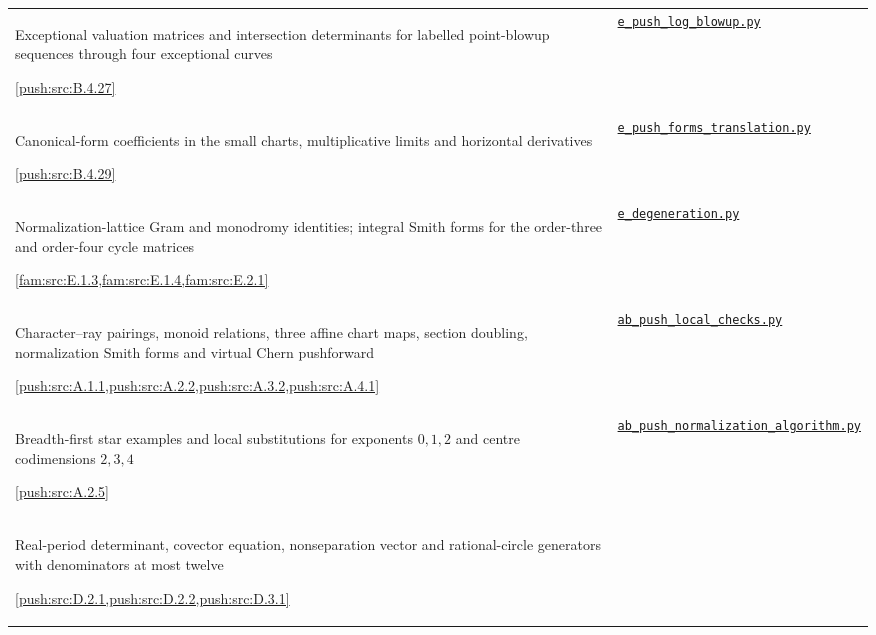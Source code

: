 {\begin{longtable}{@{}>{\raggedright\arraybackslash}p{}>{\raggedright\arraybackslash}p{}@{}}
Exceptional valuation matrices and intersection determinants for labelled point-blowup sequences through four exceptional curves\par \cref{push:src:B.4.27} &
\href{https://raw.githubusercontent.com/KokunoYumeto/s6-complex-structure-workbench/\SsixRepositoryCommit/pro_returns/S6_02_PUSH_final_20261115T2217Z/S6_02_PUSH/code/e_push_log_blowup.py}{\nolinkurl{e_push_log_blowup.py}} \\[3pt]
Canonical-form coefficients in the small charts, multiplicative limits and horizontal derivatives\par \cref{push:src:B.4.29} &
\href{https://raw.githubusercontent.com/KokunoYumeto/s6-complex-structure-workbench/\SsixRepositoryCommit/pro_returns/S6_02_PUSH_final_20261115T2217Z/S6_02_PUSH/code/e_push_forms_translation.py}{\nolinkurl{e_push_forms_translation.py}} \\[3pt]
Normalization-lattice Gram and monodromy identities; integral Smith forms for the order-three and order-four cycle matrices\par \cref{fam:src:E.1.3,fam:src:E.1.4,fam:src:E.2.1} &
\href{https://raw.githubusercontent.com/KokunoYumeto/s6-complex-structure-workbench/\SsixRepositoryCommit/pro_returns/S6_02_FAMILY/return/code/e_degeneration.py}{\nolinkurl{e_degeneration.py}} \\[3pt]
Character--ray pairings, monoid relations, three affine chart maps, section doubling, normalization Smith forms and virtual Chern pushforward\par \cref{push:src:A.1.1,push:src:A.2.2,push:src:A.3.2,push:src:A.4.1} &
\href{https://raw.githubusercontent.com/KokunoYumeto/s6-complex-structure-workbench/\SsixRepositoryCommit/pro_returns/S6_02_PUSH_final_20261115T2217Z/S6_02_PUSH/code/ab_push_local_checks.py}{\nolinkurl{ab_push_local_checks.py}} \\[3pt]
Breadth-first star examples and local substitutions for exponents $0,1,2$ and centre codimensions $2,3,4$\par \cref{push:src:A.2.5} &
\href{https://raw.githubusercontent.com/KokunoYumeto/s6-complex-structure-workbench/\SsixRepositoryCommit/pro_returns/S6_02_PUSH_final_20261115T2217Z/S6_02_PUSH/code/ab_push_normalization_algorithm.py}{\nolinkurl{ab_push_normalization_algorithm.py}} \\[3pt]
Real-period determinant, covector equation, nonseparation vector and rational-circle generators with denominators at most twelve\par \cref{push:src:D.2.1,push:src:D.2.2,push:src:D.3.1} &

\end{longtable}}
